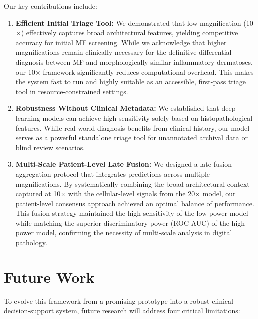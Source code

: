 \documentclass[conference]{IEEEtran}
\begin{document}
Our key contributions include:
\begin{enumerate}
    \item \textbf{Efficient Initial Triage Tool:} We demonstrated that low magnification (10$\times$) effectively captures broad architectural 
    features, yielding competitive accuracy for initial MF screening. While we acknowledge that higher magnifications remain clinically necessary for 
    the definitive differential diagnosis between MF and morphologically similar inflammatory dermatoses, our 10$\times$ framework significantly reduces 
    computational overhead. This makes the system fast to run and highly suitable as an accessible, first-pass triage tool in resource-constrained settings.
    
    \item \textbf{Robustness Without Clinical Metadata:} We established that deep learning models can achieve high sensitivity solely based on 
    histopathological features. While real-world diagnosis benefits from clinical history, our model serves as a powerful standalone triage tool 
    for unannotated archival data or blind review scenarios.

    \item \textbf{Multi-Scale Patient-Level Late Fusion:} We designed a late-fusion aggregation protocol that integrates predictions across 
    multiple magnifications. By systematically combining the broad architectural context captured at 10$\times$ with the cellular-level signals from 
    the 20$\times$ model, our patient-level consensus approach achieved an optimal balance of performance. This fusion strategy maintained the high 
    sensitivity of the low-power model while matching the superior discriminatory power (ROC-AUC) of the high-power model, confirming the necessity of 
    multi-scale analysis in digital pathology.
    
\end{enumerate}
\section{Future Work}
To evolve this framework from a promising prototype into a robust clinical decision-support system, future research will address four critical limitations:
\end{document}
